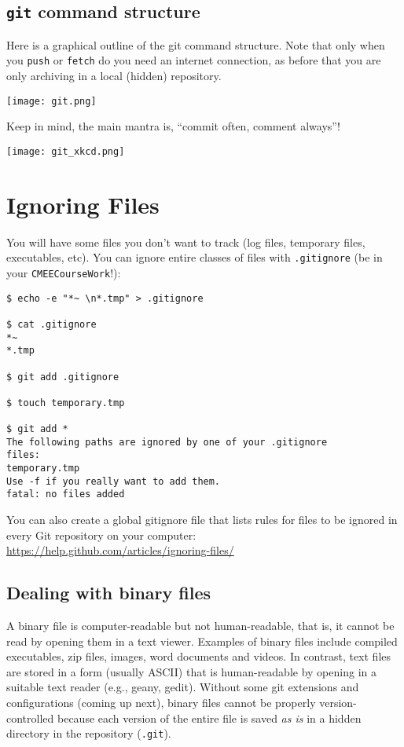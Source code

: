\subsection{{\tt git} command structure}
\label{ssec:git_comds}
Here is a graphical outline of the git command structure. Note that 
only when you {\tt push} or  {\tt fetch} do you need an internet 
connection, as before that you are only archiving in a local (hidden) 
repository. 
 
  \begin{center}
		\texttt{[image: git.png]}
	\end{center}

Keep in mind, the main mantra is, ``commit often, comment always''!

  \begin{center}
		\texttt{[image: git\_xkcd.png]}
	\end{center}
	 
\section{Ignoring Files}

You will have some files you don't want to track (log files, temporary 
files, executables, etc). You can ignore entire classes of files with 
{\tt .gitignore} (be in your {\tt CMEECourseWork}!):

\begin{lstlisting}
$ echo -e "*~ \n*.tmp" > .gitignore

$ cat .gitignore
*~
*.tmp

$ git add .gitignore

$ touch temporary.tmp

$ git add *
The following paths are ignored by one of your .gitignore 
files:
temporary.tmp
Use -f if you really want to add them.
fatal: no files added
\end{lstlisting}

You can also create a global gitignore file that lists rules for files 
to be ignored in every Git repository on your computer:  
\url{https://help.github.com/articles/ignoring-files/} 

\subsection{Dealing with binary files}

A binary file is computer-readable but not human-readable, that 
is, it cannot be read by opening them in a text viewer. Examples of 
binary files include compiled executables, zip files, images, word 
documents  and videos. In contrast, text files are stored in a form (usually ASCII) 
that is human-readable by opening in a suitable text reader (e.g., 
geany, gedit). Without some git extensions and configurations (coming up 
next), binary files cannot be properly version-controlled because each version of
the entire file is saved {\it as is} in a hidden directory in the repository ({\tt .git}).

